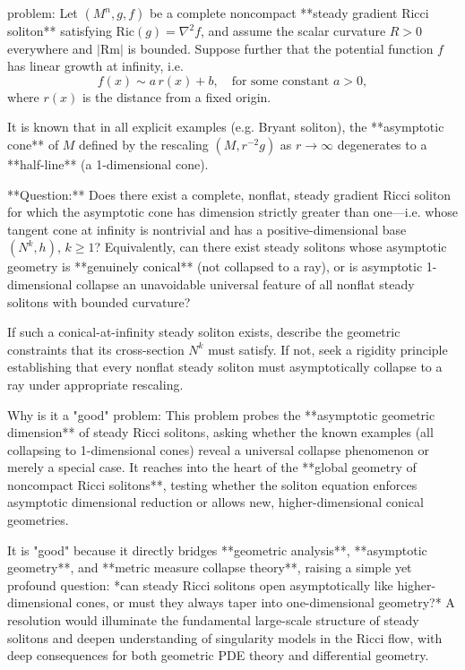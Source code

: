 problem:  
Let \((M^n, g, f)\) be a complete noncompact **steady gradient Ricci soliton** satisfying \(\mathrm{Ric}(g) = \nabla^2 f\), and assume the scalar curvature \(R > 0\) everywhere and \(|\mathrm{Rm}|\) is bounded.  
Suppose further that the potential function \(f\) has linear growth at infinity, i.e.  
\[
f(x) \sim a\, r(x) + b, \quad \text{for some constant } a > 0,
\]
where \(r(x)\) is the distance from a fixed origin.  

It is known that in all explicit examples (e.g. Bryant soliton), the **asymptotic cone** of \(M\) defined by the rescaling \( (M, r^{-2} g) \) as \(r \to \infty\) degenerates to a **half-line** (a 1-dimensional cone).  

**Question:**  
Does there exist a complete, nonflat, steady gradient Ricci soliton for which the asymptotic cone has dimension strictly greater than one—i.e. whose tangent cone at infinity is nontrivial and has a positive-dimensional base \( (N^{k}, h) \), \( k \ge 1 \)?  
Equivalently, can there exist steady solitons whose asymptotic geometry is **genuinely conical** (not collapsed to a ray), or is asymptotic 1-dimensional collapse an unavoidable universal feature of all nonflat steady solitons with bounded curvature?  

If such a conical-at-infinity steady soliton exists, describe the geometric constraints that its cross-section \(N^{k}\) must satisfy. If not, seek a rigidity principle establishing that every nonflat steady soliton must asymptotically collapse to a ray under appropriate rescaling.

Why is it a "good" problem:  
This problem probes the **asymptotic geometric dimension** of steady Ricci solitons, asking whether the known examples (all collapsing to 1-dimensional cones) reveal a universal collapse phenomenon or merely a special case. It reaches into the heart of the **global geometry of noncompact Ricci solitons**, testing whether the soliton equation enforces asymptotic dimensional reduction or allows new, higher-dimensional conical geometries.  

It is "good" because it directly bridges **geometric analysis**, **asymptotic geometry**, and **metric measure collapse theory**, raising a simple yet profound question: *can steady Ricci solitons open asymptotically like higher-dimensional cones, or must they always taper into one-dimensional geometry?*  
A resolution would illuminate the fundamental large-scale structure of steady solitons and deepen understanding of singularity models in the Ricci flow, with deep consequences for both geometric PDE theory and differential geometry.
